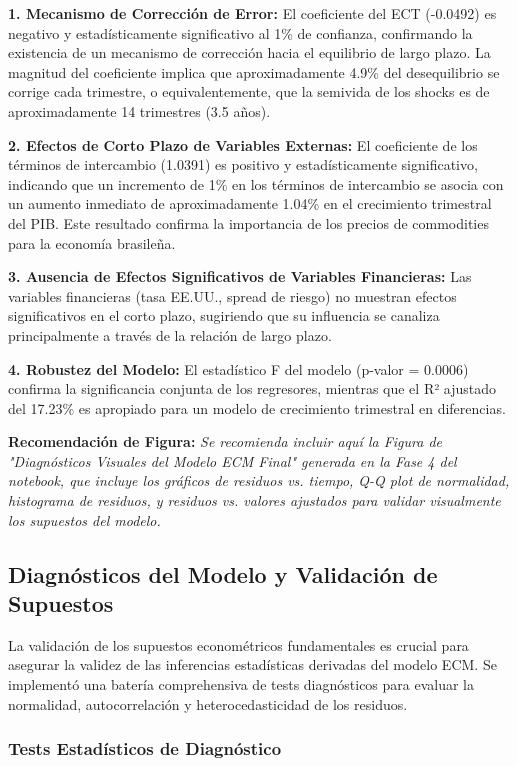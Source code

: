 \documentclass[3p,11pt]{elsarticle}
\begin{document}
\textbf{1. Mecanismo de Corrección de Error:} El coeficiente del ECT (-0.0492) es negativo y estadísticamente significativo al 1\% de confianza, confirmando la existencia de un mecanismo de corrección hacia el equilibrio de largo plazo. La magnitud del coeficiente implica que aproximadamente 4.9\% del desequilibrio se corrige cada trimestre, o equivalentemente, que la semivida de los shocks es de aproximadamente 14 trimestres (3.5 años).

\textbf{2. Efectos de Corto Plazo de Variables Externas:} El coeficiente de los términos de intercambio (1.0391) es positivo y estadísticamente significativo, indicando que un incremento de 1\% en los términos de intercambio se asocia con un aumento inmediato de aproximadamente 1.04\% en el crecimiento trimestral del PIB. Este resultado confirma la importancia de los precios de commodities para la economía brasileña.

\textbf{3. Ausencia de Efectos Significativos de Variables Financieras:} Las variables financieras (tasa EE.UU., spread de riesgo) no muestran efectos significativos en el corto plazo, sugiriendo que su influencia se canaliza principalmente a través de la relación de largo plazo.

\textbf{4. Robustez del Modelo:} El estadístico F del modelo (p-valor = 0.0006) confirma la significancia conjunta de los regresores, mientras que el R² ajustado del 17.23\% es apropiado para un modelo de crecimiento trimestral en diferencias.

\textbf{Recomendación de Figura:} \textit{Se recomienda incluir aquí la Figura de "Diagnósticos Visuales del Modelo ECM Final" generada en la Fase 4 del notebook, que incluye los gráficos de residuos vs. tiempo, Q-Q plot de normalidad, histograma de residuos, y residuos vs. valores ajustados para validar visualmente los supuestos del modelo.}

\subsection{Diagnósticos del Modelo y Validación de Supuestos}

La validación de los supuestos econométricos fundamentales es crucial para asegurar la validez de las inferencias estadísticas derivadas del modelo ECM. Se implementó una batería comprehensiva de tests diagnósticos para evaluar la normalidad, autocorrelación y heterocedasticidad de los residuos.

\subsubsection{Tests Estadísticos de Diagnóstico}
\end{document}
